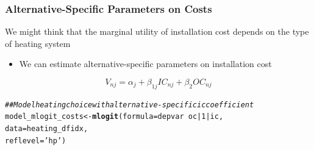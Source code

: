 \documentclass{beamer}\usepackage[]{graphicx}\usepackage[]{xcolor}
\makeatletter
\newcommand{\hlnum}[1]{\textcolor[rgb]{0.686,0.059,0.569}{#1}}%
\newcommand{\hlstr}[1]{\textcolor[rgb]{0.192,0.494,0.8}{#1}}%
\newcommand{\hlcom}[1]{\textcolor[rgb]{0.678,0.584,0.686}{\textit{#1}}}%
\newcommand{\hlopt}[1]{\textcolor[rgb]{0,0,0}{#1}}%
\newcommand{\hlstd}[1]{\textcolor[rgb]{0.345,0.345,0.345}{#1}}%
\newcommand{\hlkwb}[1]{\textcolor[rgb]{0.69,0.353,0.396}{#1}}%
\newcommand{\hlkwc}[1]{\textcolor[rgb]{0.333,0.667,0.333}{#1}}%
\newcommand{\hlkwd}[1]{\textcolor[rgb]{0.737,0.353,0.396}{\textbf{#1}}}%
\newenvironment{kframe}{%
 \def\at@end@of@kframe{}%
 \ifinner\ifhmode%
  \def\at@end@of@kframe{\end{minipage}}%
  \begin{minipage}{\columnwidth}%
 \fi\fi%
 \def\FrameCommand##1{\hskip\@totalleftmargin \hskip-\fboxsep
 \colorbox{shadecolor}{##1}\hskip-\fboxsep
     \hskip-\linewidth \hskip-\@totalleftmargin \hskip\columnwidth}%
 \MakeFramed {\advance\hsize-\width
   \@totalleftmargin\z@ \linewidth\hsize
   \@setminipage}}%
 {\par\unskip\endMakeFramed%
 \at@end@of@kframe}
\newenvironment{knitrout}{}{} %
\makeatother
\begin{document}
\begin{frame}[fragile]\frametitle{Alternative-Specific Parameters on Costs}
	We might think that the marginal utility of installation cost depends on the type of heating system
	\begin{itemize}
		\item We can estimate alternative-specific parameters on installation cost
	\end{itemize}
	$$V_{nj} = \alpha_j + \beta_{1j} IC_{nj} + \beta_2 OC_{nj}$$
\begin{knitrout}\footnotesize
{}\color{fgcolor}\begin{kframe}
\begin{alltt}
\hlcom{## Model heating choice with alternative-specific ic coefficient}
\hlstd{model_mlogit_costs} \hlkwb{<-} \hlkwd{mlogit}\hlstd{(}\hlkwc{formula} \hlstd{= depvar} \hlopt{~} \hlstd{oc} \hlopt{|} \hlnum{1} \hlopt{|} \hlstd{ic,}
                             \hlkwc{data} \hlstd{= heating_dfidx,}
                             \hlkwc{reflevel} \hlstd{=} \hlstr{'hp'}\hlstd{)}
\end{alltt}
\end{kframe}
\end{knitrout}
\end{frame}
\end{document}
